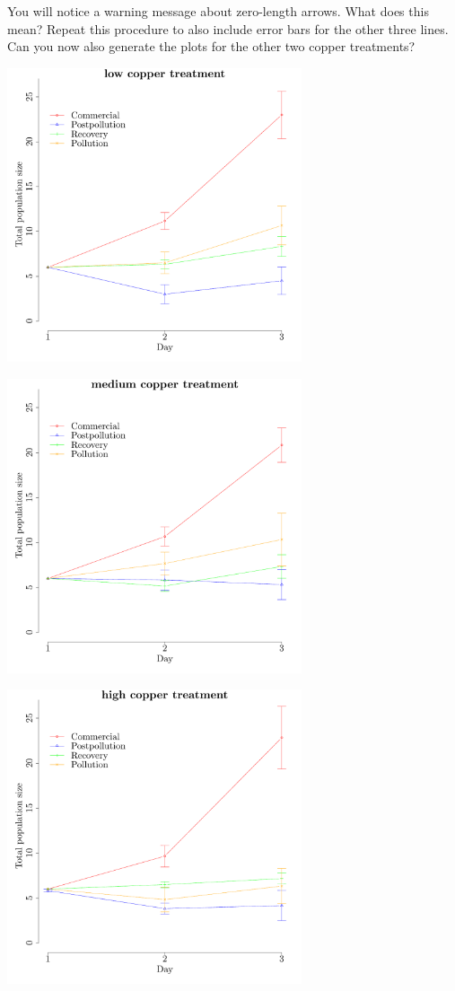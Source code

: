 \documentclass{article}\usepackage[]{graphicx}\usepackage[]{color}
\newenvironment{knitrout}{}{} %
\begin{document}
You will notice a warning message about zero-length arrows. What does this mean? Repeat this procedure to also include error bars for the other three lines. Can you now also generate the plots for the other two copper treatments? 
\begin{knitrout}
\color{fgcolor}

{\centering \includegraphics[width=0.65\textwidth]{figure/gekkeplot1} 

}




{\centering \includegraphics[width=0.65\textwidth]{figure/gekkeplot2} 

}




{\centering \includegraphics[width=0.65\textwidth]{figure/gekkeplot3} 

}
\end{knitrout}
\end{document}
